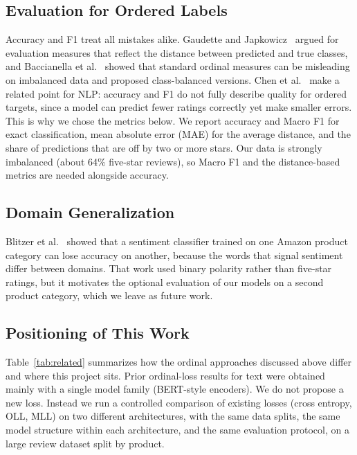 \subsection{Evaluation for Ordered Labels}
Accuracy and F1 treat all mistakes alike. Gaudette and Japkowicz~\cite{gaudette2009} argued for evaluation measures that reflect the distance between predicted and true classes, and Baccianella et al.~\cite{baccianella2009} showed that standard ordinal measures can be misleading on imbalanced data and proposed class-balanced versions. Chen et al.~\cite{chen2021} make a related point for NLP: accuracy and F1 do not fully describe quality for ordered targets, since a model can predict fewer ratings correctly yet make smaller errors. This is why we chose the metrics below. We report accuracy and Macro F1 for exact classification, mean absolute error (MAE) for the average distance, and the share of predictions that are off by two or more stars. Our data is strongly imbalanced (about 64\% five-star reviews), so Macro F1 and the distance-based metrics are needed alongside accuracy.

\subsection{Domain Generalization}
Blitzer et al.~\cite{blitzer2007} showed that a sentiment classifier trained on one Amazon product category can lose accuracy on another, because the words that signal sentiment differ between domains. That work used binary polarity rather than five-star ratings, but it motivates the optional evaluation of our models on a second product category, which we leave as future work.

\subsection{Positioning of This Work}
Table~\ref{tab:related} summarizes how the ordinal approaches discussed above differ and where this project sits. Prior ordinal-loss results for text were obtained mainly with a single model family (BERT-style encoders). We do not propose a new loss. Instead we run a controlled comparison of existing losses (cross entropy, OLL, MLL) on two different architectures, with the same data splits, the same model structure within each architecture, and the same evaluation protocol, on a large review dataset split by product.

